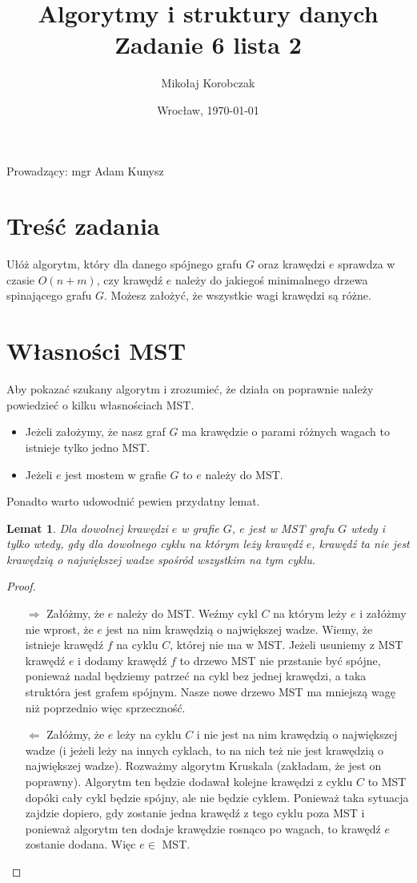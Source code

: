 \documentclass[11pt,wide]{mwart}
\date{Wrocław, \today}
\title{\LARGE\textbf{Algorytmy i struktury danych}\\Zadanie 6 lista 2}
\author{Mikołaj Korobczak}
\begin{document}
\maketitle
\begin{center}
Prowadzący: mgr Adam Kunysz
\end{center}
\thispagestyle{empty}

\section{Treść zadania}
Ułóż algorytm, który dla danego spójnego grafu $G$ oraz krawędzi $e$ sprawdza w czasie $O(n+m)$, czy krawędź $e$ należy do jakiegoś minimalnego drzewa spinającego grafu $G$. Możesz założyć, że wszystkie wagi krawędzi są różne.

\section{Własności MST}
Aby pokazać szukany algorytm i zrozumieć, że działa on poprawnie należy powiedzieć o kilku własnościach MST.
\begin{itemize}
\item Jeżeli założymy, że nasz graf $G$ ma krawędzie o parami różnych wagach to istnieje tylko jedno MST.
\item Jeżeli $e$ jest mostem w grafie $G$ to $e$ należy do MST.
\end{itemize}

\noindent Ponadto warto udowodnić pewien przydatny lemat.
\newtheorem{theorem}{Lemat}
\begin{theorem}
Dla dowolnej krawędzi $e$ w grafie $G$, $e$ jest w MST grafu $G$ wtedy i tylko wtedy, gdy dla dowolnego cyklu na którym leży krawędź $e$, krawędź ta nie jest krawędzią o największej wadze spośród wszystkim na tym cyklu.
\end{theorem}
\begin{proof}
$ $ \\
\begin{itemize}
\item[$\Rightarrow$] Załóżmy, że $e$ należy do MST. Weźmy cykl $C$ na którym leży $e$ i załóżmy nie wprost, że $e$ jest na nim krawędzią o największej wadze. Wiemy, że istnieje krawędź $f$ na cyklu $C$, której nie ma w MST. Jeżeli usuniemy z MST krawędź $e$ i dodamy krawędź $f$ to drzewo MST nie przstanie być spójne, ponieważ nadal będziemy patrzeć na cykl bez jednej krawędzi, a taka struktóra jest grafem spójnym. Nasze nowe drzewo MST ma mniejszą wagę niż poprzednio więc sprzeczność. \Lightning
\item[$\Leftarrow$] Załóżmy, że $e$ leży na cyklu $C$ i nie jest na nim krawędzią o największej wadze (i jeżeli leży na innych cyklach, to na nich też nie jest krawędzią o największej wadze). Rozważmy algorytm Kruskala (zakładam, że jest on poprawny). Algorytm ten będzie dodawał kolejne krawędzi z cyklu $C$ to MST dopóki cały cykl będzie spójny, ale nie będzie cyklem. Ponieważ taka sytuacja zajdzie dopiero, gdy zostanie jedna krawędź z tego cyklu poza MST i ponieważ algorytm ten dodaje krawędzie rosnąco po wagach, to krawędź $e$ zostanie dodana. Więc $e \in$ MST.
\end{itemize}
\end{proof}
\end{document}
